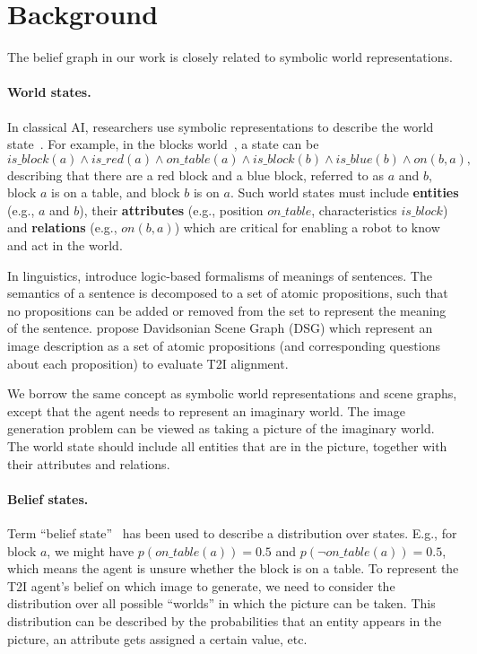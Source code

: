 




\section{Background}
\label{sec:background}
The belief graph in our work is closely related to symbolic world representations.
\vspace{-1em}
\paragraph{World states.}  In classical AI, researchers use symbolic representations to describe the world state~\citep{McCHay69, minsky1974framework, minsky1988society, pasula2007learning, kaelbling2011hierarchical}. For example, in the blocks world~\citep{ginsberg1988reasoning, gupta1992complexity, alkhazraji-et-al-zenodo2020}, a state can be $$is\_block(a) \wedge is\_red(a) \wedge on\_table(a) \wedge is\_block(b) \wedge is\_blue(b) \wedge on(b, a),$$ describing that there are a red block and a blue block, referred to as $a$ and $b$, block $a$ is on a table, and block $b$ is on $a$. Such world states must include \textbf{entities} (e.g., $a$ and $b$), their \textbf{attributes} (e.g., position $on\_table$, characteristics $is\_block$) and \textbf{relations} (e.g., $on(b, a)$) which are critical for enabling a robot to know and act in the world.

In linguistics, \cite{davidson2001theories,davidson2001logical,davidson1967truth} introduce logic-based formalisms of meanings of sentences. The semantics of a sentence is decomposed to a set of atomic propositions, such that no propositions can be added or removed from the set to represent the meaning of the sentence. \citep{cho2023davidsonian} propose Davidsonian Scene Graph (DSG) which represent an image description as a set of atomic propositions (and corresponding questions about each proposition) to evaluate T2I alignment. %



We borrow the same concept as symbolic world representations and scene graphs, except that the agent needs to represent an imaginary world. The image generation problem can be viewed as taking a picture of the imaginary world. The world state should include all entities that are in the picture, together with their attributes and relations.


\vspace{-1em}
\paragraph{Belief states.} Term ``belief state''~\citep{nilsson1986probabilistic, kaelbling1998planning} has been used to describe a distribution over states. %
E.g., for block $a$, we might have $p(on\_table(a)) = 0.5$ and $p(\neg on\_table(a)) = 0.5$, which means the agent is unsure whether the block is on a table. To represent the T2I agent's belief on which image to generate, we need to consider the distribution over all possible ``worlds'' in which the picture can be taken. This distribution can be described by the probabilities that an entity appears in the picture, an attribute gets assigned a certain value, etc.

